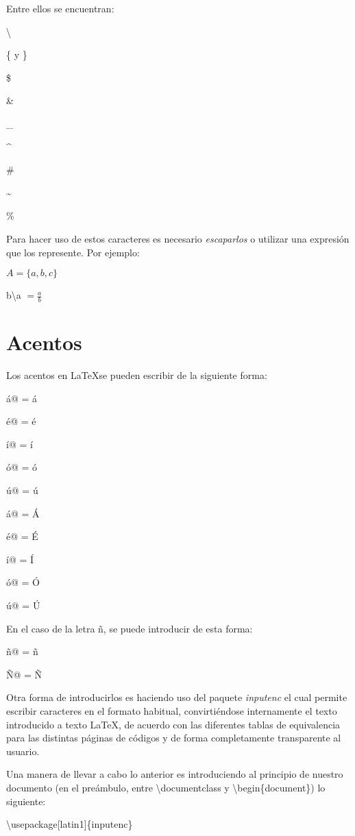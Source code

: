 \documentclass[letterpaper,11pt]{article}
\begin{document}
Entre ellos se encuentran:

\textbackslash

\{ y \}

\$

\&

\_

\^{}

\#

\~{}

\%

Para hacer uso de estos caracteres es necesario \textit{escaparlos} o utilizar una expresión que los represente. Por ejemplo:

$A = \{a, b, c\}$

b\textbackslash a $= \frac{a}{b}$


\section{Acentos}

Los acentos en \LaTeX se pueden escribir de la siguiente forma:

\verb@\'a@ = \'a

\verb@\'e@ = \'e

\verb@\'i@ = \'i

\verb@\'o@ = \'o

\verb@\'u@ = \'u

\verb@\'a@ = \'A

\verb@\'e@ = \'E

\verb@\'i@ = \'I

\verb@\'o@ = \'O

\verb@\'u@ = \'U

En el caso de la letra \~n, se puede introducir de esta forma:

\verb@\~n@ = \~n

\verb@\~N@ = \~N

\noindent Otra forma de introducirlos es haciendo uso del paquete \textit{inputenc} el cual permite escribir caracteres en el formato habitual, convirtiéndose internamente el texto introducido a texto LaTeX, de acuerdo con las diferentes tablas de equivalencia para las 
distintas páginas de códigos y de forma completamente transparente al usuario.

\noindent Una manera de llevar a cabo lo anterior es introduciendo al principio de nuestro documento (en el preámbulo, entre \textbackslash documentclass y \textbackslash begin\{document\}) lo siguiente:

\textbackslash usepackage[latin1]\{inputenc\}
\end{document}
